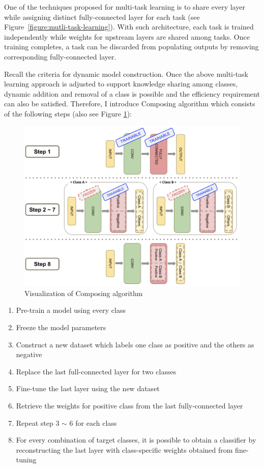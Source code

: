 \documentclass{article}
\begin{document}
One of the techniques proposed for multi-task learning is to share every layer while assigning distinct fully-connected layer for each task (see Figure~\ref{figure:mutli-task-learning}). With such architecture, each task is trained independently while weights for upstream layers are shared among tasks. Once training completes, a task can be discarded from populating outputs by removing corresponding fully-connected layer.

Recall the criteria for dynamic model construction. Once the above multi-task learning approach is adjusted to support knowledge sharing among classes, dynamic addition and removal of a class is possible and the efficiency requirement can also be satisfied. Therefore, I introduce Composing algorithm which consists of the following steps (also see Figure \ref{figure:composing_algo}):

\begin{figure}[t]
    \centering
    \includegraphics[scale=0.3,trim={0mm 0mm 0mm 0mm},clip]{composing_algo.png}
    \caption{Visualization of Composing algorithm}
    \label{figure:composing_algo}
\end{figure}


\begin{enumerate}
    \item Pre-train a model using every class
    \item Freeze the model parameters
    \item Construct a new dataset which labels one class as positive and the others as negative
    \item Replace the last full-connected layer for two classes
    \item Fine-tune the last layer using the new dataset
    \item Retrieve the weights for positive class from the last fully-connected layer
    \item Repeat step 3 $\sim$ 6 for each class
    \item For every combination of target classes, it is possible to obtain a classifier by reconstructing the last layer with class-specific weights obtained from fine-tuning
\end{enumerate}
\end{document}
